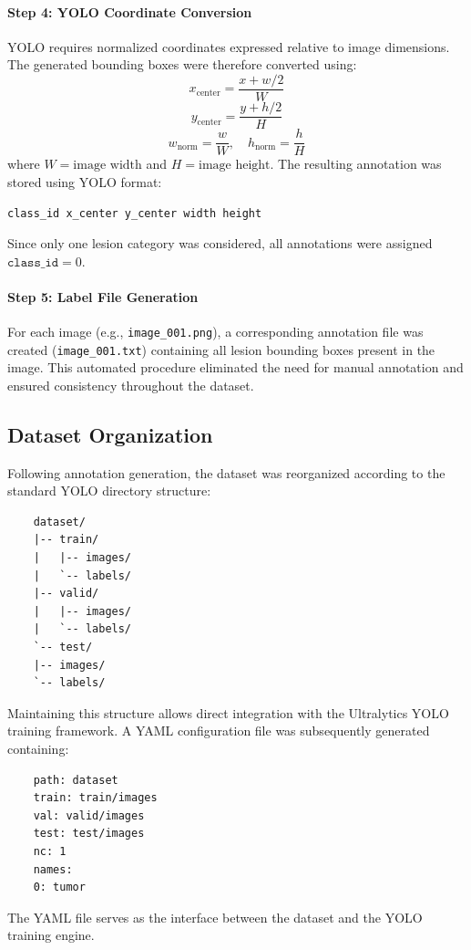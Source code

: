 \paragraph{Step 4: YOLO Coordinate Conversion}
YOLO requires normalized coordinates expressed relative to image dimensions. The generated bounding boxes were therefore converted using:
\begin{equation}
	x_{\text{center}} = \frac{x + w/2}{W}
\end{equation}
\begin{equation}
	y_{\text{center}} = \frac{y + h/2}{H}
\end{equation}
\begin{equation}
	w_{\text{norm}} = \frac{w}{W}, \quad h_{\text{norm}} = \frac{h}{H}
\end{equation}
where $W = \text{image width}$ and $H = \text{image height}$. The resulting annotation was stored using YOLO format:
\begin{center}
	\texttt{class\_id x\_center y\_center width height}
\end{center}
Since only one lesion category was considered, all annotations were assigned $\texttt{class\_id} = 0$.

\paragraph{Step 5: Label File Generation}
For each image (e.g., \texttt{image\_001.png}), a corresponding annotation file was created (\texttt{image\_001.txt}) containing all lesion bounding boxes present in the image. This automated procedure eliminated the need for manual annotation and ensured consistency throughout the dataset.

\subsection{Dataset Organization}
Following annotation generation, the dataset was reorganized according to the standard YOLO directory structure:
\begin{verbatim}
	dataset/
	|-- train/
	|   |-- images/
	|   `-- labels/
	|-- valid/
	|   |-- images/
	|   `-- labels/
	`-- test/
	|-- images/
	`-- labels/
\end{verbatim}
Maintaining this structure allows direct integration with the Ultralytics YOLO training framework. A YAML configuration file was subsequently generated containing:
\begin{verbatim}
	path: dataset
	train: train/images
	val: valid/images
	test: test/images
	nc: 1
	names:
	0: tumor
\end{verbatim}
The YAML file serves as the interface between the dataset and the YOLO training engine.

